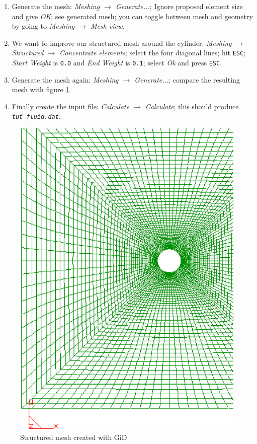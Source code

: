 \begin{enumerate}
\item Generate the mesh: \emph{Meshing $\rightarrow$ Generate...};
Ignore proposed element size and give \emph{OK}; see generated mesh;
you can toggle between mesh and geometry by going to \emph{Meshing
$\rightarrow$ Mesh view}.
\item We want to improve our structured mesh around the cylinder:
\emph{Meshing $\rightarrow$ Structured $\rightarrow$ Concentrate elements};
select the four diagonal lines; hit \texttt{ESC}; 
\emph{Start Weight} is \texttt{0.0} and \emph{End Weight} is \texttt{0.1};
select \emph{Ok} and press \texttt{ESC}.
\item Generate the mesh again: \emph{Meshing $\rightarrow$ Generate...}; compare the resulting mesh with figure \ref{fig:tut_fluid_mesh}.
\item Finally create the \baci{} input file: \emph{Calculate $\rightarrow$ Calculate};
this should produce \texttt{\emph{tut\_fluid.dat}}.
\end{enumerate}
%
\begin{figure}[h]
\begin{center}
 \includegraphics[scale=0.25]{pics/tut_fluid_mesh}
 \caption{Structured mesh created with GiD}
\label{fig:tut_fluid_mesh}
\end{center}
\end{figure}

